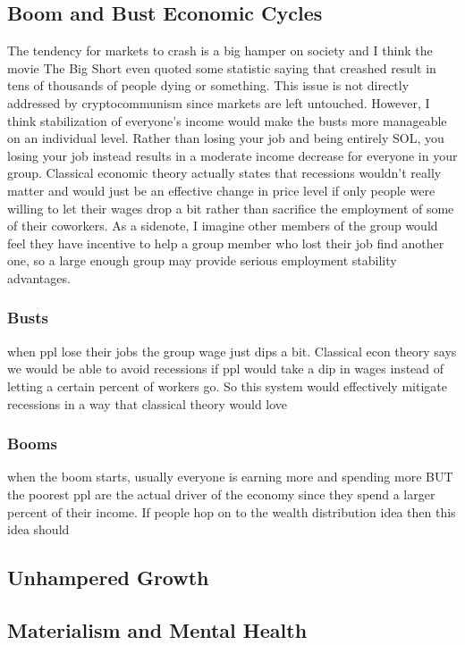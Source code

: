 \documentclass{article}[10pt]
\begin{document}
\subsection{Boom and Bust Economic Cycles} 
The tendency for markets to crash is a big hamper on society and I think the movie The Big Short even quoted some statistic saying that creashed result in tens of thousands of people dying or something. 
This issue is not directly addressed by cryptocommunism since markets are left untouched. 
However, I think stabilization of everyone's income would make the busts more manageable on an individual level. 
Rather than losing your job and being entirely SOL, you losing your job instead results in a moderate income decrease for everyone in your group.
Classical economic theory actually states that recessions wouldn't really matter and would just be an effective change in price level if only people were willing to let their wages drop a bit rather than sacrifice the employment of some of their coworkers. 
As a sidenote, I imagine other members of the group would feel they have incentive to help a group member who lost their job find another one, so a large enough group may provide serious employment stability advantages.

\subsubsection{Busts}
when ppl lose their jobs the group wage just dips a bit. Classical econ theory says we would be able to avoid recessions if ppl would take a dip in wages instead of letting a certain percent of workers go. 
So this system would effectively mitigate recessions in a way that classical theory would love
\subsubsection{Booms}
when the boom starts, usually everyone is earning more and spending more BUT the poorest ppl are the actual driver of the economy since they spend a larger percent of their income. 
If people hop on to the wealth distribution idea then this idea should 

\subsection{Unhampered Growth}

\subsection{Materialism and Mental Health}
\end{document}
